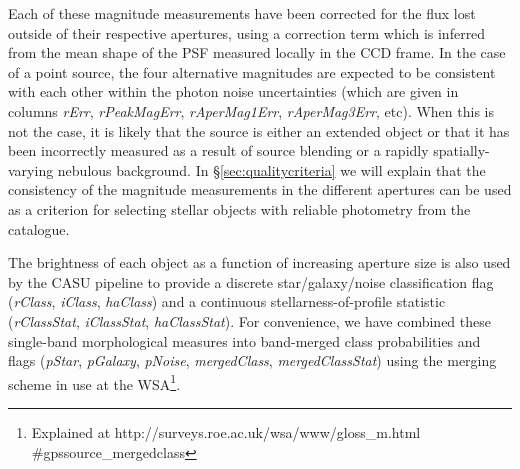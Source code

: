 \documentclass[useAMS,usenatbib]{mn2e}
\begin{document}
Each of these magnitude measurements have been
corrected for the flux lost outside of their respective apertures,
using a correction term which is inferred from the
mean shape of the PSF measured locally in the CCD frame.
In the case of a point source,
the four alternative magnitudes are expected
to be consistent with each other
within the photon noise uncertainties
(which are given in columns \emph{rErr}, \emph{rPeakMagErr},
\emph{rAperMag1Err}, \emph{rAperMag3Err}, etc).
When this is not the case,
it is likely that the source is either
an extended object or that it has
been incorrectly measured as a result of
source blending or a rapidly spatially-varying nebulous background.
In \S\ref{sec:qualitycriteria} we will explain that the consistency
of the magnitude measurements in the different apertures
can be used as a criterion for selecting stellar objects
with reliable photometry from the catalogue.

The brightness of each object as a function of increasing
aperture size is also used by the CASU pipeline to provide
a discrete star/galaxy/noise classification flag
(\emph{rClass}, \emph{iClass}, \emph{haClass})
and a continuous stellarness-of-profile statistic
(\emph{rClassStat}, \emph{iClassStat}, \emph{haClassStat}).
For convenience, we have combined
these single-band morphological measures
into band-merged class probabilities and flags
(\emph{pStar}, \emph{pGalaxy}, \emph{pNoise},
\emph{mergedClass}, \emph{mergedClassStat})
using the merging scheme in use at the WSA\footnote{Explained at
http://surveys.roe.ac.uk/wsa/www/gloss\_m.html \#gpssource\_mergedclass
}.
\end{document}
